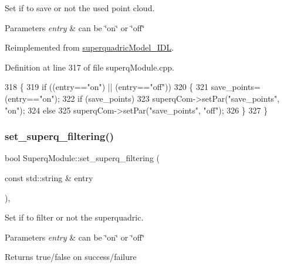 Set if to save or not the used point cloud. 


\begin{DoxyParams}{Parameters}
{\em entry} & can be \char`\"{}on\char`\"{} or \char`\"{}off\char`\"{} \\
\hline
\end{DoxyParams}


Reimplemented from \mbox{\hyperlink{classsuperquadricModel__IDL_a8368b783845a3e5ae7e0706ee5b888c0}{superquadric\+Model\+\_\+\+I\+DL}}.



Definition at line 317 of file superq\+Module.\+cpp.


\begin{DoxyCode}
318 \{
319     \textcolor{keywordflow}{if} ((entry==\textcolor{stringliteral}{"on"}) || (entry==\textcolor{stringliteral}{"off"}))
320     \{
321         save_points=(entry==\textcolor{stringliteral}{"on"});
322         \textcolor{keywordflow}{if} (save_points)
323             superqCom->setPar(\textcolor{stringliteral}{"save\_points"}, \textcolor{stringliteral}{"on"});
324         \textcolor{keywordflow}{else}
325             superqCom->setPar(\textcolor{stringliteral}{"save\_points"}, \textcolor{stringliteral}{"off"});
326     \}    
327 \}
\end{DoxyCode}
\mbox{\label{classSuperqModule_a902d4a48d1a919ff9d9b1f7d1c132577}} 
\subsubsection{\texorpdfstring{set\+\_\+superq\+\_\+filtering()}{set\_superq\_filtering()}}
{\footnotesize\ttfamily bool Superq\+Module\+::set\+\_\+superq\+\_\+filtering (\begin{DoxyParamCaption}\item[{const std\+::string \&}]{entry }\end{DoxyParamCaption})\hspace{0.3cm}{\ttfamily [protected]}, {\ttfamily [virtual]}}



Set if to filter or not the superquadric. 


\begin{DoxyParams}{Parameters}
{\em entry} & can be \char`\"{}on\char`\"{} or \char`\"{}off\char`\"{} \\
\hline
\end{DoxyParams}
\begin{DoxyReturn}{Returns}
true/false on success/failure 
\end{DoxyReturn}


